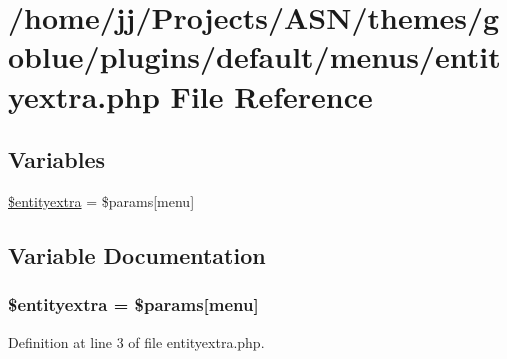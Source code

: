\hypertarget{themes_2goblue_2plugins_2default_2menus_2entityextra_8php}{}\section{/home/jj/\+Projects/\+A\+S\+N/themes/goblue/plugins/default/menus/entityextra.php File Reference}
\label{themes_2goblue_2plugins_2default_2menus_2entityextra_8php}
\subsection*{Variables}
\begin{DoxyCompactItemize}
\item 
\hyperlink{themes_2goblue_2plugins_2default_2menus_2entityextra_8php_a49c9f0f64ec7c8b9aa3defaa4177af8d}{\$entityextra} = \$params\mbox{[}\textquotesingle{}menu\textquotesingle{}\mbox{]}
\end{DoxyCompactItemize}


\subsection{Variable Documentation}
\subsubsection[{\texorpdfstring{\$entityextra}{$entityextra}}]{\setlength{\rightskip}{0pt plus 5cm}\$entityextra = \$params\mbox{[}\textquotesingle{}menu\textquotesingle{}\mbox{]}}\hypertarget{themes_2goblue_2plugins_2default_2menus_2entityextra_8php_a49c9f0f64ec7c8b9aa3defaa4177af8d}{}\label{themes_2goblue_2plugins_2default_2menus_2entityextra_8php_a49c9f0f64ec7c8b9aa3defaa4177af8d}


Definition at line 3 of file entityextra.\+php.

